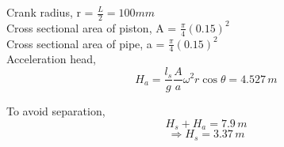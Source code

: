 \documentclass{article}
\begin{document}
\begin{multicols*}{2}
      Crank radius, r = $\frac{L}{2} = 100 mm$ \\
      Cross sectional area of piston, A = $\frac{\pi}{4} (0.15)^2$ \\ 
      Cross sectional area of pipe, a = $\frac{\pi}{4} (0.15)^2$\\
      Acceleration head, $$H_a = \frac{l_s}{g} \frac{A}{a} \omega^2 r \cos \theta = 4.527 \, m $$
      
      To avoid separation,
      $$H_s + H_a = 7.9 \, m$$
      $$\Rightarrow H_s = 3.37 \, m$$
    \end{multicols*}
\end{document}
